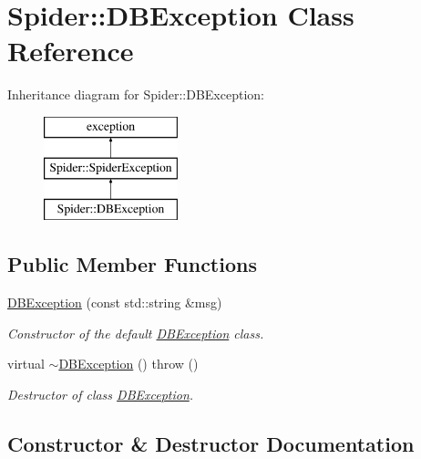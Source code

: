 \hypertarget{class_spider_1_1_d_b_exception}{}\section{Spider\+:\+:D\+B\+Exception Class Reference}
\label{class_spider_1_1_d_b_exception}
Inheritance diagram for Spider\+:\+:D\+B\+Exception\+:\begin{figure}[H]
\begin{center}
\leavevmode
\includegraphics[height=3.000000cm]{class_spider_1_1_d_b_exception}
\end{center}
\end{figure}
\subsection*{Public Member Functions}
\begin{DoxyCompactItemize}
\item 
\hyperlink{class_spider_1_1_d_b_exception_a3f256a7e5b01d9d68b9d65305868aa29}{D\+B\+Exception} (const std\+::string \&msg)
\begin{DoxyCompactList}\small\item\em Constructor of the default \hyperlink{class_spider_1_1_d_b_exception}{D\+B\+Exception} class. \end{DoxyCompactList}\item 
\mbox{\label{class_spider_1_1_d_b_exception_ace8f79b6896a3bb356ca254ad9116190}} 
virtual \hyperlink{class_spider_1_1_d_b_exception_ace8f79b6896a3bb356ca254ad9116190}{$\sim$\+D\+B\+Exception} ()  throw ()
\begin{DoxyCompactList}\small\item\em Destructor of class \hyperlink{class_spider_1_1_d_b_exception}{D\+B\+Exception}. \end{DoxyCompactList}\end{DoxyCompactItemize}


\subsection{Constructor \& Destructor Documentation}
\mbox{\label{class_spider_1_1_d_b_exception_a3f256a7e5b01d9d68b9d65305868aa29}} 

